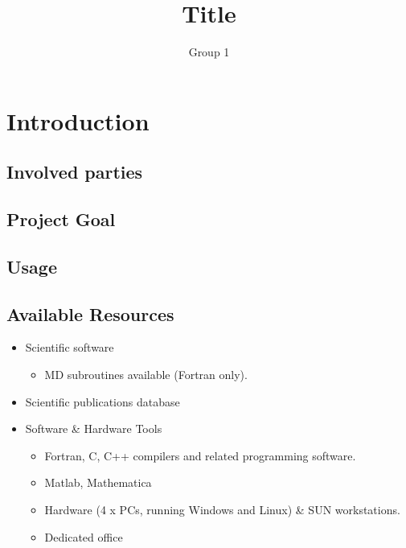 \documentclass[12pt,a4paper]{article}
\begin{document}
\title{Title}
\author{Group 1}
 
\granskad{----}{\today}
\godkand{----}{\today}
\maketitle
\makestatus
\makeprojektidentitet
\makegruppmedlemmar
\makeprojektinfo
\makeinnehall

\section{Introduction}
\label{sec:Introduction}

\subsection{Involved parties}

\subsection{Project Goal}

\subsection{Usage}

\subsection{Available Resources}
\begin{itemize}
\item Scientific software
	\begin{itemize}
	\item MD subroutines available (Fortran only). 
	\end{itemize}
\item Scientific publications database
\item Software \& Hardware Tools
	\begin{itemize}
	\item Fortran, C, C++ compilers and related programming software. 
	\item Matlab, Mathematica
	\item Hardware (4 x PCs, running Windows and Linux) \& SUN workstations. 
	\item Dedicated office
	\end{itemize}
\end{itemize}
\end{document}
